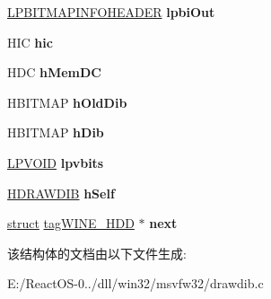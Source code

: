 \begin{DoxyCompactItemize}
\hyperlink{struct_b_i_t_m_a_p_i_n_f_o_h_e_a_d_e_r}{L\+P\+B\+I\+T\+M\+A\+P\+I\+N\+F\+O\+H\+E\+A\+D\+ER} {\bfseries lpbi\+Out}
\item 
\mbox{\label{structtag_w_i_n_e___h_d_d_a619564717759b3573b4e724d0117d059}} 
H\+IC {\bfseries hic}
\item 
\mbox{\label{structtag_w_i_n_e___h_d_d_a440635eaf61a73a5c37aeb267ff685dc}} 
H\+DC {\bfseries h\+Mem\+DC}
\item 
\mbox{\label{structtag_w_i_n_e___h_d_d_a59b14615aa403a435cc3b4118877babb}} 
H\+B\+I\+T\+M\+AP {\bfseries h\+Old\+Dib}
\item 
\mbox{\label{structtag_w_i_n_e___h_d_d_a4d7050b1cbaf643986b4bbca51143e0a}} 
H\+B\+I\+T\+M\+AP {\bfseries h\+Dib}
\item 
\mbox{\label{structtag_w_i_n_e___h_d_d_a8e9a2b0be0b106cf553cc0453f718fa1}} 
\hyperlink{interfacevoid}{L\+P\+V\+O\+ID} {\bfseries lpvbits}
\item 
\mbox{\label{structtag_w_i_n_e___h_d_d_adb8740b1695b8a717b0aea3f86258131}} 
\hyperlink{interfacevoid}{H\+D\+R\+A\+W\+D\+IB} {\bfseries h\+Self}
\item 
\mbox{\label{structtag_w_i_n_e___h_d_d_ac93256511e3871844aef4dfaa4b38df0}} 
\hyperlink{interfacestruct}{struct} \hyperlink{structtag_w_i_n_e___h_d_d}{tag\+W\+I\+N\+E\+\_\+\+H\+DD} $\ast$ {\bfseries next}
\end{DoxyCompactItemize}


该结构体的文档由以下文件生成\+:\begin{DoxyCompactItemize}
\item 
E\+:/\+React\+O\+S-\/0../dll/win32/msvfw32/drawdib.\+c\end{DoxyCompactItemize}
